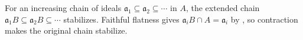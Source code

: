 For an increasing chain of ideals $\mathfrak{a}_1\subseteq\mathfrak{a}_2\subseteq\cdots$ in $A$, the extended chain $\mathfrak{a}_1B\subseteq\mathfrak{a}_2B\subseteq\cdots$ stabilizes. Faithful flatness gives $\mathfrak{a}_iB\cap A=\mathfrak{a}_i$ by , so contraction makes the original chain stabilize.
